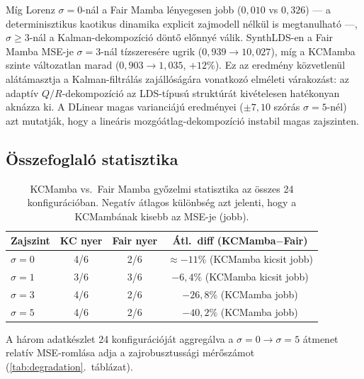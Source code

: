 Míg Lorenz $\sigma=0$-nál a Fair Mamba lényegesen jobb ($0{,}010$ vs $0{,}326$) ---
a determinisztikus kaotikus dinamika explicit zajmodell nélkül is megtanulható ---,
$\sigma{\geq}3$-nál a Kalman-dekompozíció döntő előnnyé válik.
SynthLDS-en a Fair Mamba MSE-je $\sigma=3$-nál tízszeresére ugrik
($0{,}939 \to 10{,}027$), míg a KCMamba szinte változatlan marad
($0{,}903 \to 1{,}035$, $+12\%$). Ez az eredmény közvetlenül alátámasztja a
Kalman-filtrálás zajállóságára vonatkozó elméleti várakozást: az adaptív
$Q/R$-dekompozíció az LDS-típusú struktúrát kivételesen hatékonyan aknázza ki.
A DLinear magas varianciájú eredményei ($\pm7{,}10$ szórás $\sigma=5$-nél) azt
mutatják, hogy a lineáris mozgóátlag-dekompozíció instabil magas zajszinten.

\subsection{Összefoglaló statisztika}

\begin{table}[H]
    \centering
    \begin{tabular}{|l|c|c|c|}
        \hline
        \textbf{Zajszint} & \textbf{KC nyer} & \textbf{Fair nyer} & \textbf{Átl.\ diff (KCMamba$-$Fair)} \\
        \hline\hline
        $\sigma = 0$ & 4/6 & 2/6 & $\approx{-}11\%$ (KCMamba kicsit jobb) \\
        $\sigma = 1$ & 3/6 & 3/6 & $-6{,}4\%$ (KCMamba kicsit jobb) \\
        $\sigma = 3$ & 4/6 & 2/6 & $-26{,}8\%$ (KCMamba jobb) \\
        $\sigma = 5$ & 4/6 & 2/6 & $-40{,}2\%$ (KCMamba jobb) \\
        \hline
    \end{tabular}
    \caption{KCMamba vs.\ Fair Mamba győzelmi statisztika az összes 24 konfigurációban.
             Negatív átlagos különbség azt jelenti, hogy a KCMambának kisebb az MSE-je (jobb).}
    \label{tab:win_stats}
\end{table}

A három adatkészlet 24 konfigurációját aggregálva a $\sigma=0 \to \sigma=5$
átmenet relatív MSE-romlása adja a zajrobusztussági mérőszámot
(\ref{tab:degradation}.~táblázat).

